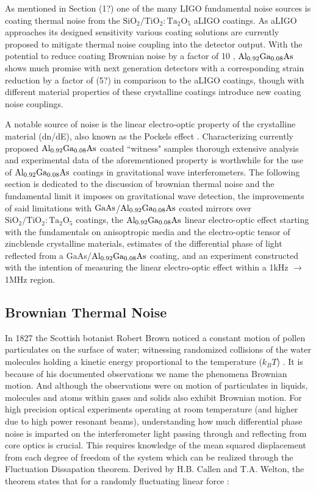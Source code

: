 
 As mentioned in Section (1?) one of the many LIGO fundamental noise sources is coating thermal noise from the $\mathrm{SiO_2}/\mathrm{TiO_2:Ta_2O_5}$ aLIGO coatings. As aLIGO approaches its designed sensitivity various coating solutions are currently proposed to mitigate thermal noise coupling into the detector output.
With the potential to reduce coating Brownian noise by a factor of 10 \cite{Cole:2013}, $\mathrm{Al_{0.92}Ga_{0.08}As}$ shows much promise with next generation detectors with a corresponding strain reduction by a factor of (5?) in comparison to the aLIGO coatings, though with different material properties of these crystalline coatings introduce new coating noise couplings.

A notable source of noise is the linear electro-optic property of the crystalline material (dn/dE), also known as the Pockels effect \cite{abernathy_poster}. Characterizing currently proposed $\mathrm{Al_{0.92}Ga_{0.08}As}$ coated ``witness" samples thorough extensive analysis and experimental data of the aforementioned property is worthwhile for the use of $\mathrm{Al_{0.92}Ga_{0.08}As}$ coatings in gravitational wave interferometers. The following section is dedicated to the discussion of brownian thermal noise and the fundamental limit it imposes on gravitational wave detection, the improvements of said limitations with $\mathrm{GaAs}$/$\mathrm{Al_{0.92}Ga_{0.08}As}$ coated mirrors over $\mathrm{SiO_2}/\mathrm{TiO_2:Ta_2O_5}$ coatings, the $\mathrm{Al_{0.92}Ga_{0.08}As}$ linear electro-optic effect starting with the fundamentals on anisoptropic media and the electro-optic tensor of zincblende crystalline materials, estimates of the differential phase of light reflected from a GaAs/$\mathrm{Al_{0.92}Ga_{0.08}As}$ coating, and an experiment constructed with the intention of measuring the linear electro-optic effect within a 1kHz $\rightarrow$ 1MHz region.

\subsection{Brownian Thermal Noise}
 In 1827 the Scottish botanist Robert Brown noticed a constant motion of pollen particulates on the surface of water; witnessing randomized collisions of the water molecules holding a kinetic energy proportional to the temperature ($k_BT$) \cite{Brown:1828}. It is because of his documented observations we name the phenomena Brownian motion. And although the observations were on motion of particulates in liquids, molecules and atoms within gases and solids also exhibit Brownian motion. For high precision optical experiments operating at room temperature (and higher due to high power resonant beams), understanding how much differential phase noise is imparted on the interferometer light passing through and reflecting from core optics is crucial. This requires knowledge of the mean squared displacement from each degree of freedom of the system which can be realized through the Fluctuation Dissapation theorem. Derived by H.B. Callen and T.A. Welton, the theorem states that for a randomly fluctuating linear force \cite{Callen:1951}:

